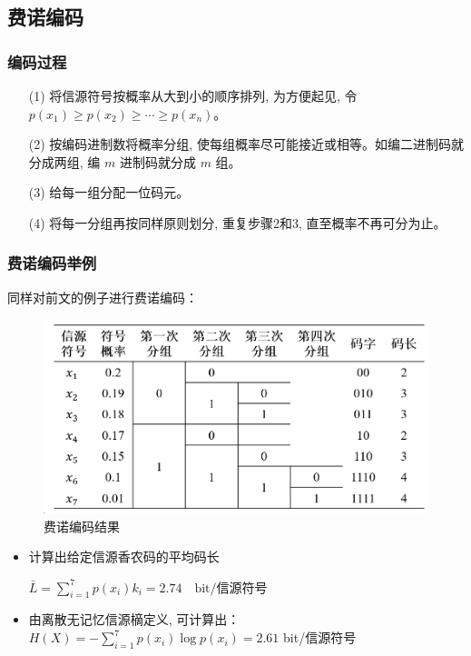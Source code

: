 \begin{multicols}{2}
\subsection{费诺编码}
\subsubsection{编码过程}
\begin{enumerate}
	\item[(1)] 将信源符号按概率从大到小的顺序排列, 为方便起见, 令 $p\left(x_1\right) \geqslant p\left(x_2\right) \geqslant \cdots \geqslant p\left(x_n\right)$。
	
	\item[(2)] 按编码进制数将概率分组, 使每组概率尽可能接近或相等。如编二进制码就分成两组, 编 $m$ 进制码就分成 $m$ 组。
	
	\item[(3)] 给每一组分配一位码元。
	
	\item[(4)] 将每一分组再按同样原则划分, 重复步骤2和3, 直至概率不再可分为止。
\end{enumerate}

\subsubsection{费诺编码举例}
同样对前文的例子进行费诺编码：
\begin{figure}[H]
	\centering
	\includegraphics[width=0.95\linewidth]{screenshot001}
	\caption{费诺编码结果}
	\label{fig:screenshot001}
\end{figure}
\begin{itemize}
	\item 计算出给定信源香农码的平均码长
	
	$\bar{L}=\sum_{i=1}^7 p\left(x_i\right) k_i=2.74 \quad \text{bit/信源符号}$
	
	\item 由离散无记忆信源樀定义, 可计算出：
	$H(X)=-\sum_{i=1}^7 p\left(x_i\right) \log p\left(x_i\right)=2.61$ bit/信源符号
	

\end{itemize}
\end{multicols}
